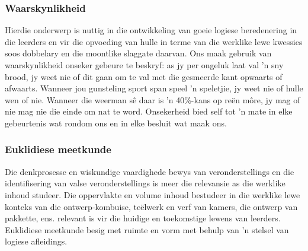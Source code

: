 \subsubsection{Waarskynlikheid}
Hierdie onderwerp is nuttig in die ontwikkeling van goeie logiese beredenering in die leerders en vir die opvoeding van hulle in terme van die werklike lewe kwessies soos dobbelary en die moontlike slaggate daarvan. Ons maak gebruik van waarskynlikheid onseker gebeure te beskryf: as jy per ongeluk laat val 'n sny brood, jy weet nie of dit gaan om te val met die gesmeerde kant opwaarts of afwaarts. Wanneer jou gunsteling sport span speel 'n speletjie, jy weet nie of hulle wen of nie. Wanneer die weerman s\^{e} daar is 'n 40\%-kans op re\"{e}n m\^{o}re, jy mag of nie mag nie die einde om nat te word. Onsekerheid bied self tot 'n mate in elke gebeurtenis wat rondom ons en in elke besluit wat maak ons.

\subsubsection{Euklidiese meetkunde}
Die denkprosesse en wiskundige vaardighede bewys van veronderstellings en die identifisering van valse veronderstellings is meer die relevansie as die werklike inhoud studeer. Die oppervlakte en volume inhoud bestudeer in die werklike lewe konteks van die ontwerp-kombuise, te\"{e}lwerk en verf van kamers, die ontwerp van pakkette, ens.
relevant is vir die huidige en toekomstige lewens van leerders. Euklidiese meetkunde besig met ruimte en vorm met behulp van 'n stelsel van logiese afleidings.


